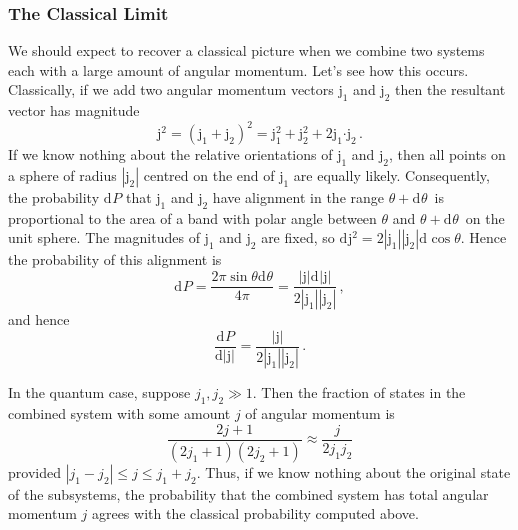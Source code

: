 \documentclass{article}
\theoremstyle{plain}\theoremheaderfont{\normalfont\itshape}\theorembodyfont{\rmfamily}\theoremseparator{.}\newtheorem*{rem}{Remark}\newtheorem*{ex}{Example}\newtheorem*{proof}{Proof}\newtheorem*{altp}{Alternative proof}
\theoremstyle{plain}\theoremheaderfont{\normalfont\bfseries}\theorembodyfont{\rmfamily}\theoremseparator{.}\newtheorem{thm}{Theorem}[section]\newtheorem{lem}[thm]{Lemma}\newtheorem{prop}[thm]{Proposition}\newtheorem*{cor}{Corollary}\newtheorem{defn}[thm]{Definition}\newtheorem{clm}[thm]{Claim}\newtheorem{clminproof}{Claim}
\theoremstyle{break}\theoremheaderfont{\normalfont\itshape}\theorembodyfont{\rmfamily}\theoremseparator{.\medskip}\newtheorem*{proofskip}{Proof}\newtheorem*{exs}{Examples}\newtheorem*{rems}{Remarks}
\theoremstyle{break}\theoremheaderfont{\normalfont\bfseries}\theorembodyfont{\rmfamily}\theoremseparator{.\medskip}\newtheorem{lemskip}[thm]{Lemma}\newtheorem{defnskip}[thm]{Definition}\newtheorem{propskip}[thm]{Proposition}\newtheorem{thmskip}[thm]{Theorem}
\numberwithin{equation}{section}
\newcommand{\dd}[2][]{\mathrm{d}^{#1} #2\,}
\renewcommand{\d}[2][]{\mathrm{d}^{#1} #2}
\newcommand{\dv}[3][]{\frac{\mathrm{d}^{#1} #2}{{\mathrm{d} #3}^{#1}}}
\newcommand{\vb}[1]{\bm{\mathrm{#1}}}
\newcommand{\vdot}{\bm{\cdot}}
\newcommand{\abs}[1]{\left| #1 \right|}
\begin{document}
    \subsubsection{The Classical Limit}
    We should expect to recover a classical picture when we combine two systems each with a large amount of angular momentum. Let's see how this occurs. Classically, if we add two angular momentum vectors \(\vb{j}_1\) and \(\vb{j}_2\) then the resultant vector has magnitude
    \begin{equation}
        \vb{j}^2=(\vb{j}_1+\vb{j}_2)^2=\vb{j}_1^2+\vb{j}_2^2+2\vb{j}_1\vdot\vb{j}_2\,.
    \end{equation}
    If we know nothing about the relative orientations of \(\vb{j}_1\) and \(\vb{j}_2\), then all points on a sphere of radius \(\abs{\vb{j}_2}\) centred on the end of \(\vb{j}_1\) are equally likely. Consequently, the probability \(\d{P}\) that \(\vb{j}_1\) and \(\vb{j}_2\) have alignment in the range \(\theta+\dd{\theta}\) is proportional to the area of a band with polar angle between \(\theta\) and \(\theta+\dd{\theta}\) on the unit sphere. The magnitudes of \(\vb{j}_1\) and \(\vb{j}_2\) are fixed, so \(\d{\vb{j}^2}=2\abs{\vb{j}_1}\abs{\vb{j}_2}\d{\cos\theta}\). Hence the probability of this alignment is
    \begin{equation}
        \d{P}=\frac{2\pi\sin\theta\d{\theta}}{4\pi}=\frac{\abs{\vb{j}}\d{\abs{\vb{j}}}}{2\abs{\vb{j}_1}\abs{\vb{j}_2}}\,,
    \end{equation}
    and hence
    \begin{equation}
        \dv{P}{\abs{\vb{j}}}=\frac{\abs{\vb{j}}}{2\abs{\vb{j}_1}\abs{\vb{j}_2}}\,.
    \end{equation}

    In the quantum case, suppose \(j_1,j_2\gg 1\). Then the fraction of states in the combined system with some amount \(j\) of angular momentum is
    \begin{equation}
        \frac{2j+1}{(2j_1+1)(2j_2+1)}\approx\frac{j}{2j_1j_2}
    \end{equation}
    provided \(\abs{j_1-j_2}\le j\le j_1+j_2\). Thus, if we know nothing about the original state of the subsystems, the probability that the combined system has total angular momentum \(j\) agrees with the classical probability computed above.
\end{document}
